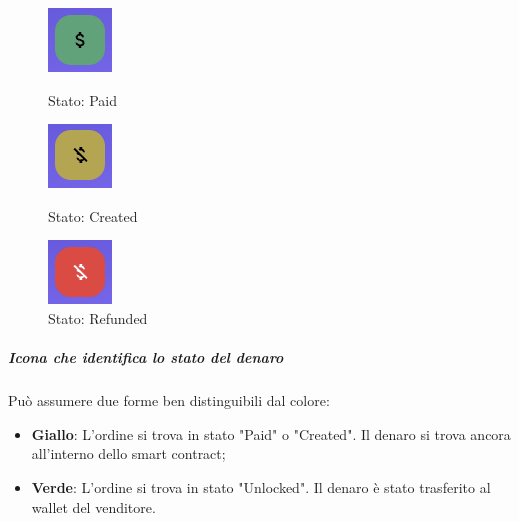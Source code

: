            \begin{figure}[H]
                \centering
                \begin{minipage}{0.33\textwidth}
                    \centering
                    \includegraphics[scale=0.6]{immagini/Transaction/Paid.png} 
                    \caption{Stato: Paid}
                \end{minipage}\hfill
                \begin{minipage}{0.33\textwidth}
                \centering
                    \includegraphics[scale=0.6]{immagini/Transaction/Created.png} 
                    \caption{Stato: Created}
                \end{minipage}
                \begin{minipage}{0.33\textwidth}
                    \centering
                        \includegraphics[scale=0.6]{immagini/Transaction/Refunded.png} 
                        \caption{Stato: Refunded}
                    \end{minipage}
            \end{figure}
            \subparagraph{Icona che identifica lo stato del denaro}
            Può assumere due forme ben distinguibili dal colore:
            \begin{itemize}
                \item \textbf{Giallo}: L'ordine si trova in stato "Paid" o "Created". Il denaro si trova ancora all'interno dello smart contract\glo{};
                \item \textbf{Verde}: L'ordine si trova in stato "Unlocked". Il denaro è stato trasferito al wallet\glo{} del venditore.
            \end{itemize}
